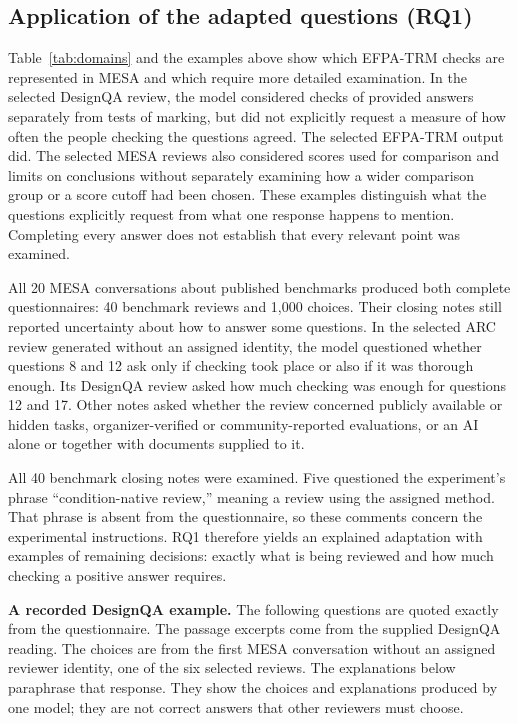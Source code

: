 \documentclass[10pt,conference]{IEEEtran}
\begin{document}
\subsection{Application of the adapted questions (RQ1)}
Table~\ref{tab:domains} and the examples above show which EFPA-TRM checks are represented in MESA and which require more detailed examination. In the selected DesignQA review, the model considered checks of provided answers separately from tests of marking, but did not explicitly request a measure of how often the people checking the questions agreed. The selected EFPA-TRM output did. The selected MESA reviews also considered scores used for comparison and limits on conclusions without separately examining how a wider comparison group or a score cutoff had been chosen. These examples distinguish what the questions explicitly request from what one response happens to mention. Completing every answer does not establish that every relevant point was examined.

All 20 MESA conversations about published benchmarks produced both complete questionnaires: 40 benchmark reviews and 1,000 choices. Their closing notes still reported uncertainty about how to answer some questions. In the selected ARC review generated without an assigned identity, the model questioned whether questions 8 and 12 ask only if checking took place or also if it was thorough enough. Its DesignQA review asked how much checking was enough for questions 12 and 17. Other notes asked whether the review concerned publicly available or hidden tasks, organizer-verified or community-reported evaluations, or an AI alone or together with documents supplied to it.

All 40 benchmark closing notes were examined. Five questioned the experiment's phrase ``condition-native review,'' meaning a review using the assigned method. That phrase is absent from the questionnaire, so these comments concern the experimental instructions. RQ1 therefore yields an explained adaptation with examples of remaining decisions: exactly what is being reviewed and how much checking a positive answer requires.

\textbf{A recorded DesignQA example.} The following questions are quoted exactly from the questionnaire. The passage excerpts come from the supplied DesignQA reading. The choices are from the first MESA conversation without an assigned reviewer identity, one of the six selected reviews. The explanations below paraphrase that response. They show the choices and explanations produced by one model; they are not correct answers that other reviewers must choose.
\end{document}

